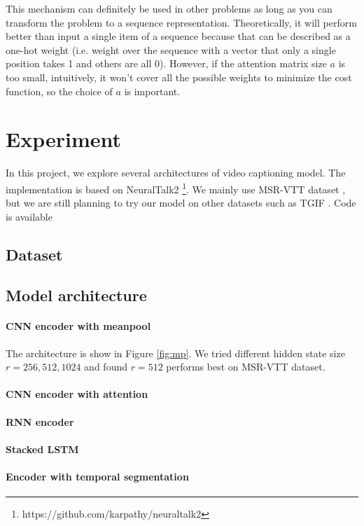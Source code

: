 This mechanism can definitely be used in other problems as long as you can transform the problem to a sequence representation. Theoretically, it will perform better than input a single item of a sequence because that can be described as a one-hot weight (i.e. weight over the sequence with a vector that only a single position takes 1 and others are all 0). However, if the attention matrix size $a$ is too small, intuitively, it won't cover all the possible weights to minimize the cost function, so the choice of $a$ is important.

\section{Experiment}
In this project, we explore several architectures of video captioning model. The implementation is based on NeuralTalk2 \footnote{https://github.com/karpathy/neuraltalk2}. We mainly use MSR-VTT dataset \cite{xu2016msr}, but we are still planning to try our model on other datasets such as TGIF \cite{li2016tgif}. Code is available 
\subsection{Dataset}

\subsection{Model architecture}
\paragraph{CNN encoder with meanpool}
The architecture is show in Figure \ref{fig:mp}. We tried different hidden state size $r=256,512,1024$ and found $r=512$ performs best on MSR-VTT dataset.

\paragraph{CNN encoder with attention}

\paragraph{RNN encoder}

\paragraph{Stacked LSTM}

\paragraph{Encoder with temporal segmentation}

